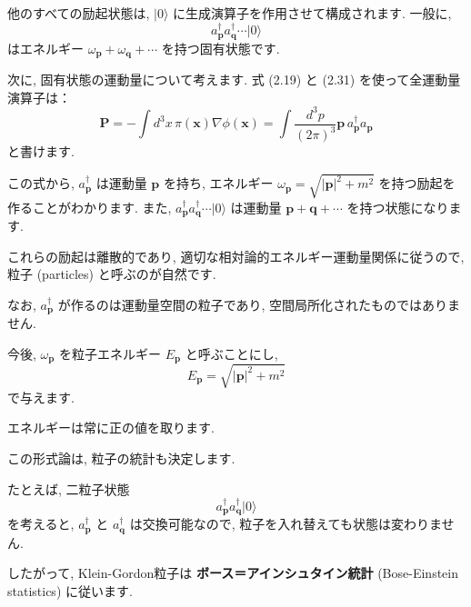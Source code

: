 \documentclass[a4paper,12pt]{article}
\begin{document}
他のすべての励起状態は, $\lvert 0 \rangle$ に生成演算子を作用させて構成されます.  
一般に,
\begin{equation*}
a^\dagger_{\mathbf{p}} a^\dagger_{\mathbf{q}} \cdots \lvert 0 \rangle
\end{equation*}
はエネルギー $\omega_{\mathbf{p}} + \omega_{\mathbf{q}} + \cdots$ を持つ固有状態です.

\vspace{0.5em}

次に, 固有状態の運動量について考えます.  
式 (2.19) と (2.31) を使って全運動量演算子は：
\begin{equation*}
\mathbf{P} = -\int d^3x\, \pi(\mathbf{x}) \nabla \phi(\mathbf{x})
= \int \frac{d^3p}{(2\pi)^3} \mathbf{p} \, a^\dagger_{\mathbf{p}} a_{\mathbf{p}}
\end{equation*}
と書けます.

\vspace{0.5em}

この式から,
$a^\dagger_{\mathbf{p}}$ は運動量 $\mathbf{p}$ を持ち, エネルギー $\omega_{\mathbf{p}} = \sqrt{|\mathbf{p}|^2 + m^2}$ を持つ励起を作ることがわかります.  
また,
$a^\dagger_{\mathbf{p}} a^\dagger_{\mathbf{q}} \cdots \lvert 0 \rangle$
は運動量 $\mathbf{p} + \mathbf{q} + \cdots$ を持つ状態になります.

\vspace{0.5em}

これらの励起は離散的であり, 適切な相対論的エネルギー運動量関係に従うので,
粒子 (particles) と呼ぶのが自然です.

なお, $a^\dagger_{\mathbf{p}}$ が作るのは運動量空間の粒子であり, 空間局所化されたものではありません.

\vspace{0.5em}

今後, $\omega_{\mathbf{p}}$ を粒子エネルギー $E_{\mathbf{p}}$ と呼ぶことにし,
\begin{equation*}
E_{\mathbf{p}} = \sqrt{|\mathbf{p}|^2 + m^2}
\end{equation*}
で与えます.

エネルギーは常に正の値を取ります.

\vspace{0.5em}

この形式論は, 粒子の統計も決定します.

たとえば, 二粒子状態
\begin{equation*}
a^\dagger_{\mathbf{p}} a^\dagger_{\mathbf{q}} \lvert 0 \rangle
\end{equation*}
を考えると, $a^\dagger_{\mathbf{p}}$ と $a^\dagger_{\mathbf{q}}$ は交換可能なので,
粒子を入れ替えても状態は変わりません.

したがって, Klein-Gordon粒子は
\textbf{ボース＝アインシュタイン統計} (Bose-Einstein statistics) に従います.


 
\end{document}
